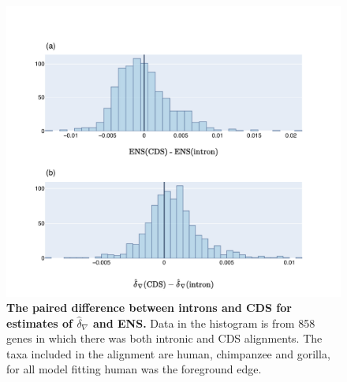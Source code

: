 \begin{figure}[htbp]
\centering
\includegraphics[width=\textwidth]{figures/plots/primate/d-conv-diff.pdf}
\caption{\textbf{The paired difference between introns and CDS for estimates of $\hat\delta_\nabla$ and ENS.} Data in the histogram is from 858 genes in which there was both intronic and CDS alignments. The taxa included in the alignment are human, chimpanzee and gorilla, for all model fitting human was the foreground edge.}
\label{fig:primate:dconv-diff}
\end{figure}
